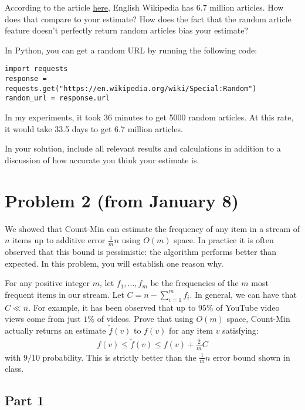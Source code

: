 \documentclass{article}
\begin{document}
According to the article \href{https://en.wikipedia.org/wiki/English_Wikipedia}{here}, English Wikipedia has 6.7 million articles. How does that compare to your estimate? How does the fact that the random article feature doesn't perfectly return random articles bias your estimate?

In Python, you can get a random URL by running the following code:

\begin{verbatim}
import requests
response = requests.get("https://en.wikipedia.org/wiki/Special:Random")
random_url = response.url	
\end{verbatim}

In my experiments, it took 36 minutes to get 5000 random articles. At this rate, it would take 33.5 days to get 6.7 million articles.

In your solution, include all relevant results and calculations in addition to a discussion of how accurate you think your estimate is.

%

\section*{Problem 2 (from January 8)}

We showed that Count-Min can estimate the frequency of any item in a stream of $n$ items up to additive error $\frac{1}{m} n$ using $O(m)$ space. In practice it is often observed that this bound is pessimistic: the algorithm performs better than expected. In this problem, you will establish one reason why. 

For any positive integer $m$, let $f_1, \ldots, f_{m}$ be the frequencies of the $m$ most frequent items in our stream. Let $C = n - \sum_{i=1}^{m} f_i$. In general, we can have that $C \ll n$. For example, it has been observed that up to $95\%$ of YouTube video views come from just $1\%$ of videos. 
Prove that using $O(m)$ space,  Count-Min actually returns an estimate $\tilde{f}(v)$ to $f(v)$ for any item $v$ satisfying:
\begin{align}\label{eq:improved_frequency_bound}
	f(v) \leq \tilde{f}(v) \leq f(v) + \frac{2}{m} C
\end{align}
with $9/10$ probability. This is strictly better than the $\frac{1}{m} n$ error bound shown in class. 

\subsection*{Part 1}
\end{document}
